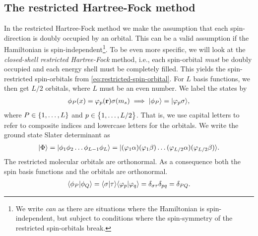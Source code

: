         \subsection{The restricted Hartree-Fock method}
            In the restricted Hartree-Fock method we make the assumption that
            each spin-direction is doubly occupied by an orbital.
            This can be a valid assumption if the Hamiltonian is
            spin-independent\footnote{%
                We write \emph{can} as there are situations where the
                Hamiltonian is spin-independent, but subject to conditions where
                the spin-symmetry of the restricted spin-orbitals break.
            }.
            To be even more specific, we will look at the \emph{closed-shell
            restricted Hartree-Fock} method, i.e., each spin-orbital \emph{must}
            be doubly occupied and each energy shell must be completely filled.
            This yields the spin-restricted spin-orbitals from
            \autoref{eq:restricted-spin-orbital}.
            For $L$ basis functions, we then get $L/2$ orbitals, where $L$ must
            be an even number.
            We label the states by
            \begin{align}
                \phi_{P}(x) = \varphi_p(\mathbf{r}) \sigma(m_s)
                \implies
                | \phi_P \rangle = | \varphi_p\sigma \rangle,
            \end{align}
            where $P \in \left\{ 1, \dots, L \right\}$ and $p \in \left\{ 1, \dots, L / 2 \right\}$.
            That is, we use capital letters to refer to composite indices and
            lowercase letters for the orbitals.
            We write the ground state Slater determinant as
            \begin{align}
                | \Phi \rangle = | \phi_1 \phi_2 \dots \phi_{L - 1} \phi_L \rangle
                = | 
                    (\varphi_1 \alpha)
                    (\varphi_1 \beta)
                    \dots
                    (\varphi_{L / 2} \alpha)
                    (\varphi_{L / 2}\beta)
                 \rangle.
            \end{align}
            The restricted molecular orbitals are orthonormal.
            As a consequence both the spin basis functions and the orbitals are
            orthonormal.
            \begin{align}
                \langle \phi_P | \phi_Q \rangle
                = \langle \sigma | \tau \rangle
                \langle \varphi_p | \varphi_q \rangle
                = \delta_{\sigma \tau}
                \delta_{pq}
                = \delta_{PQ}.
            \end{align}
